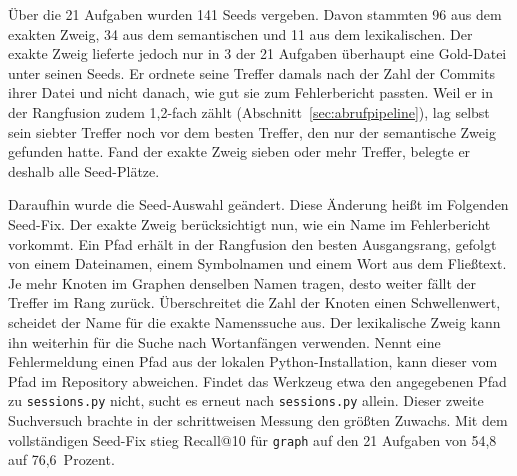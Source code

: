 Über die 21 Aufgaben wurden 141 Seeds vergeben. Davon stammten 96 aus dem exakten Zweig, 34 aus dem semantischen und 11 aus dem lexikalischen. Der exakte Zweig lieferte jedoch nur in 3 der 21 Aufgaben überhaupt eine Gold-Datei unter seinen Seeds. Er ordnete seine Treffer damals nach der Zahl der Commits ihrer Datei und nicht danach, wie gut sie zum Fehlerbericht passten. Weil er in der Rangfusion zudem 1,2-fach zählt (Abschnitt~\ref{sec:abrufpipeline}), lag selbst sein siebter Treffer noch vor dem besten Treffer, den nur der semantische Zweig gefunden hatte. Fand der exakte Zweig sieben oder mehr Treffer, belegte er deshalb alle Seed-Plätze.

Daraufhin wurde die Seed-Auswahl geändert. Diese Änderung heißt im Folgenden Seed-Fix. Der exakte Zweig berücksichtigt nun, wie ein Name im Fehlerbericht vorkommt. Ein Pfad erhält in der Rangfusion den besten Ausgangsrang, gefolgt von einem Dateinamen, einem Symbolnamen und einem Wort aus dem Fließtext. Je mehr Knoten im Graphen denselben Namen tragen, desto weiter fällt der Treffer im Rang zurück. Überschreitet die Zahl der Knoten einen Schwellenwert, scheidet der Name für die exakte Namenssuche aus. Der lexikalische Zweig kann ihn weiterhin für die Suche nach Wortanfängen verwenden. Nennt eine Fehlermeldung einen Pfad aus der lokalen Python-Installation, kann dieser vom Pfad im Repository abweichen. Findet das Werkzeug etwa den angegebenen Pfad zu \texttt{sessions.py} nicht, sucht es erneut nach \texttt{sessions.py} allein. Dieser zweite Suchversuch brachte in der schrittweisen Messung den größten Zuwachs. Mit dem vollständigen Seed-Fix stieg Recall@10 für \texttt{graph} auf den 21 Aufgaben von 54,8 auf 76,6~Prozent.


